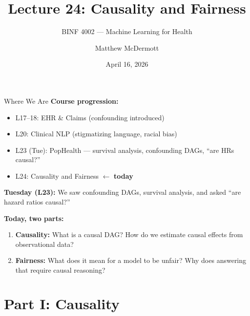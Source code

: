\documentclass[aspectratio=169,10pt]{beamer}
\title{Lecture 24: Causality and Fairness}
\subtitle{BINF 4002 --- Machine Learning for Health}
\author{Matthew McDermott}
\institute{Dept.\ of Biomedical Informatics, Columbia University}
\date{April 16, 2026}
\begin{document}
\begin{frame}[noframenumbering]
\maketitle
\end{frame}

\begin{frame}{Where We Are}
\textbf{Course progression:}
\begin{itemize}
    \item[\textcolor{columbiagray}{$\bullet$}] L17--18: EHR \& Claims (confounding introduced)
    \item[\textcolor{columbiagray}{$\bullet$}] L20: Clinical NLP (stigmatizing language, racial bias)
    \item[\textcolor{columbiagray}{$\bullet$}] L23 (Tue): PopHealth --- survival analysis, confounding DAGs, ``are HRs causal?''
    \item[\textcolor{columbiaaccent}{$\to$}] \alert{L24: Causality and Fairness} $\gets$ \textbf{today}
\end{itemize}

\vspace{0.3em}
\textbf{Tuesday (L23):} We saw confounding DAGs, survival analysis, and asked ``are hazard ratios causal?''

\vspace{0.2em}
\textbf{Today, two parts:}
\begin{enumerate}
    \item \textbf{Causality:} What is a causal DAG? How do we estimate causal effects from observational data?
    \item \textbf{Fairness:} What does it mean for a model to be unfair? Why does answering that require causal reasoning?
\end{enumerate}
\end{frame}

\section{Part I: Causality}
\end{document}
